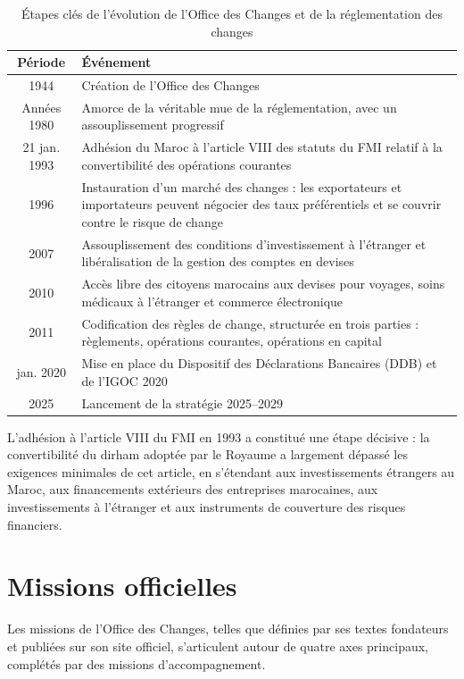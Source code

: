 \begin{table}[H]
\centering
\caption{Étapes clés de l'évolution de l'Office des Changes et de la réglementation des changes}
\renewcommand{\arraystretch}{1.4}
\begin{tabular}{|c|p{11cm}|}
\hline
\textbf{Période} & \textbf{Événement} \\
\hline
1944 & Création de l'Office des Changes \\
\hline
Années 1980 & Amorce de la véritable mue de la réglementation, avec un assouplissement progressif \\
\hline
21 jan. 1993 & Adhésion du Maroc à l'article VIII des statuts du FMI relatif à la convertibilité des opérations courantes \\
\hline
1996 & Instauration d'un marché des changes : les exportateurs et importateurs peuvent négocier des taux préférentiels et se couvrir contre le risque de change \\
\hline
2007 & Assouplissement des conditions d'investissement à l'étranger et libéralisation de la gestion des comptes en devises \\
\hline
2010 & Accès libre des citoyens marocains aux devises pour voyages, soins médicaux à l'étranger et commerce électronique \\
\hline
2011 & Codification des règles de change, structurée en trois parties : règlements, opérations courantes, opérations en capital \\
\hline
jan. 2020 & Mise en place du Dispositif des Déclarations Bancaires (DDB) et de l'IGOC 2020 \\
\hline
2025 & Lancement de la stratégie 2025--2029 \\
\hline
\end{tabular}
\end{table}

\noindent L'adhésion à l'article VIII du FMI en 1993 a constitué une étape décisive : la convertibilité du dirham adoptée par le Royaume a largement dépassé les exigences minimales de cet article, en s'étendant aux investissements étrangers au Maroc, aux financements extérieurs des entreprises marocaines, aux investissements à l'étranger et aux instruments de couverture des risques financiers.

\section{Missions officielles}

Les missions de l'Office des Changes, telles que définies par ses textes fondateurs et publiées sur son site officiel, s'articulent autour de quatre axes principaux, complétés par des missions d'accompagnement.

